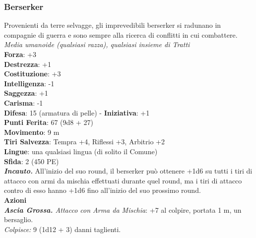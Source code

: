 \begin{multicols}{2}
\subsubsection{Berserker}

Provenienti da terre selvagge, gli imprevedibili berserker si radunano in compagnie di guerra e sono sempre alla ricerca di conflitti in cui combattere.\\
\emph{Media umanoide (qualsiasi razza), qualsiasi insieme di Tratti}\\
\textbf{Forza}: +3\\
\textbf{Destrezza}: +1\\
\textbf{Costituzione}: +3\\
\textbf{Intelligenza}: -1\\
\textbf{Saggezza}: +1\\
\textbf{Carisma}: -1\\
\textbf{Difesa}: 15 (armatura di pelle) - \textbf{Iniziativa}: +1\\
\textbf{Punti Ferita}: 67 (9d8 + 27)\\
\textbf{Movimento}: 9 m\\
\textbf{Tiri Salvezza}: Tempra +4, Riflessi +3, Arbitrio +2 \\
\textbf{Lingue}: una qualsiasi lingua (di solito il Comune)\\
\textbf{Sfida}: 2 (450 PE)\smallskip\\
\emph{\textbf{Incauto.}} All'inizio del suo round, il berserker può ottenere +1d6 su tutti i tiri di attacco con armi da mischia effettuati durante quel round, ma i tiri di attacco contro di esso hanno +1d6 fino all'inizio del suo prossimo round.\\
\smallskip\textbf{Azioni} \\
\emph{\textbf{Ascia Grossa.} Attacco con Arma da Mischia}: +7 al colpire, portata 1 m, un bersaglio.\\
\emph{Colpisce:} 9 (1d12 + 3) danni taglienti. \\



\end{multicols}

